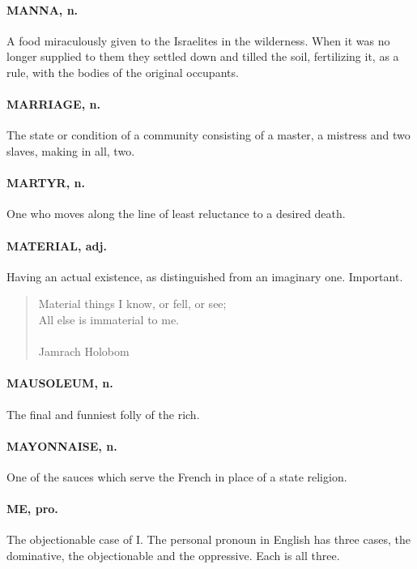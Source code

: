 \documentclass[11pt]{article}
\begin{document}
\paragraph{MANNA, n.}  A food miraculously given to the Israelites in the
wilderness.  When it was no longer supplied to them they settled
down and tilled the soil, fertilizing it, as a rule, with the bodies
of the original occupants.

\paragraph{MARRIAGE, n.}  The state or condition of a community consisting of a
master, a mistress and two slaves, making in all, two.

\paragraph{MARTYR, n.}  One who moves along the line of least reluctance to a
desired death.

\paragraph{MATERIAL, adj.}  Having an actual existence, as distinguished from an
imaginary one.  Important.

\begin{quote}   Material things I know, or fell, or see; \\
  All else is immaterial to me. \\
 \\
Jamrach Holobom \end{quote}


\paragraph{MAUSOLEUM, n.}  The final and funniest folly of the rich.

\paragraph{MAYONNAISE, n.}  One of the sauces which serve the French in place of a
state religion.

\paragraph{ME, pro.}  The objectionable case of I.  The personal pronoun in
English has three cases, the dominative, the objectionable and the
oppressive.  Each is all three.
\end{document}
